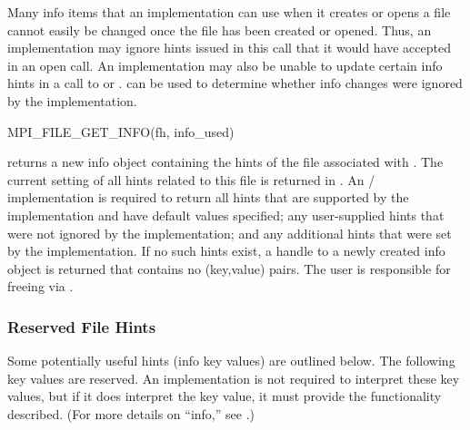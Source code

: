 \begin{users}
Many info items that an implementation can use when it
creates or opens a file cannot easily be changed
once the file has been created or opened.
Thus, an implementation may
ignore hints issued in this call that it would have
accepted in an open call.
An implementation may also be unable to update certain info hints in a call to
 or .
 can be used to determine whether info
changes were ignored by the implementation.
\end{users}

%
%
\begin{funcdef}{MPI\_FILE\_GET\_INFO}{(\mbox{fh}, \mbox{info\_used})}
\end{funcdef}

 returns a new info object containing
the hints of the file associated with .
The current setting of all hints related to this file is returned in
.  An \MPI/ implementation is required to return all hints
that are supported by the implementation and have default values
specified; any user-supplied hints that were not ignored by the
implementation; and any additional hints that were set by the
implementation.
If no such hints exist, 
a handle to a newly created info object is returned that
contains no (key,value) pairs. 
The user is responsible for freeing 
via .

\subsubsection{Reserved File Hints}

Some potentially useful hints (info key values) are outlined below.
The following key values are reserved.
An implementation is not required to interpret these key values,
but if it does interpret the key value,
it must provide the functionality described.
(For more details on ``info,'' see .)

